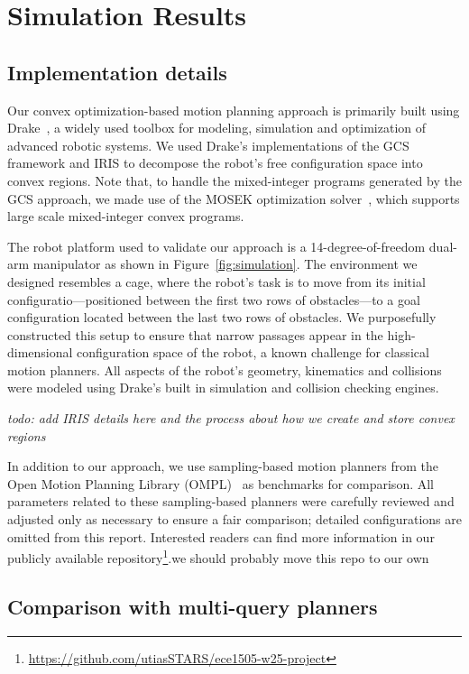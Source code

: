 \section{Simulation Results}\label{sec:results}

\subsection{Implementation details}

Our convex optimization-based motion planning approach is primarily built using Drake~\cite{drake}, a widely used toolbox for modeling, simulation and optimization of advanced robotic systems.
We used Drake's implementations of the GCS framework and IRIS to decompose the robot's free configuration space into convex regions.
Note that, to handle the mixed-integer programs generated by the GCS approach, we made use of the MOSEK optimization solver~\cite{mosek}, which supports large scale mixed-integer convex programs.

The robot platform used to validate our approach is a 14-degree-of-freedom dual-arm manipulator as shown in Figure~\ref{fig:simulation}.
The environment we designed resembles a cage, where the robot's task is to move from its initial configuratio---positioned between the first two rows of obstacles---to a goal configuration located between the last two rows of obstacles.
We purposefully constructed this setup to ensure that narrow passages appear in the high-dimensional configuration space of the robot, a known challenge for classical motion planners.
All aspects of the robot's geometry, kinematics and collisions were modeled using Drake's built in simulation and collision checking engines.

{\color{red} \textit{todo: add IRIS details here and the process about how we create and store convex regions}}

In addition to our approach, we use sampling-based motion planners from the Open Motion Planning Library (OMPL)~\cite{sucan2012open} as benchmarks for comparison.
All parameters related to these sampling-based planners were carefully reviewed and adjusted only as necessary to ensure a fair comparison; detailed configurations are omitted from this report.
Interested readers can find more information in our publicly available repository\footnote{\url{https://github.com/utiasSTARS/ece1505-w25-project}}.{\color{red}we should probably move this repo to our own}

\subsection{Comparison with multi-query planners}

